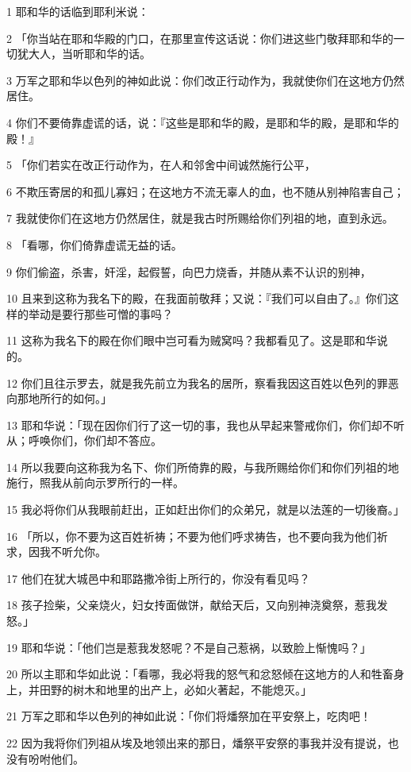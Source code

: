 \par 1 耶和华的话临到耶利米说：
\par 2 「你当站在耶和华殿的门口，在那里宣传这话说：你们进这些门敬拜耶和华的一切犹大人，当听耶和华的话。
\par 3 万军之耶和华以色列的神如此说：你们改正行动作为，我就使你们在这地方仍然居住。
\par 4 你们不要倚靠虚谎的话，说：『这些是耶和华的殿，是耶和华的殿，是耶和华的殿！』
\par 5 「你们若实在改正行动作为，在人和邻舍中间诚然施行公平，
\par 6 不欺压寄居的和孤儿寡妇；在这地方不流无辜人的血，也不随从别神陷害自己；
\par 7 我就使你们在这地方仍然居住，就是我古时所赐给你们列祖的地，直到永远。
\par 8 「看哪，你们倚靠虚谎无益的话。
\par 9 你们偷盗，杀害，奸淫，起假誓，向巴力烧香，并随从素不认识的别神，
\par 10 且来到这称为我名下的殿，在我面前敬拜；又说：『我们可以自由了。』你们这样的举动是要行那些可憎的事吗？
\par 11 这称为我名下的殿在你们眼中岂可看为贼窝吗？我都看见了。这是耶和华说的。
\par 12 你们且往示罗去，就是我先前立为我名的居所，察看我因这百姓以色列的罪恶向那地所行的如何。」
\par 13 耶和华说：「现在因你们行了这一切的事，我也从早起来警戒你们，你们却不听从；呼唤你们，你们却不答应。
\par 14 所以我要向这称我为名下、你们所倚靠的殿，与我所赐给你们和你们列祖的地施行，照我从前向示罗所行的一样。
\par 15 我必将你们从我眼前赶出，正如赶出你们的众弟兄，就是以法莲的一切後裔。」
\par 16 「所以，你不要为这百姓祈祷；不要为他们呼求祷告，也不要向我为他们祈求，因我不听允你。
\par 17 他们在犹大城邑中和耶路撒冷街上所行的，你没有看见吗？
\par 18 孩子捡柴，父亲烧火，妇女抟面做饼，献给天后，又向别神浇奠祭，惹我发怒。」
\par 19 耶和华说：「他们岂是惹我发怒呢？不是自己惹祸，以致脸上惭愧吗？」
\par 20 所以主耶和华如此说：「看哪，我必将我的怒气和忿怒倾在这地方的人和牲畜身上，并田野的树木和地里的出产上，必如火著起，不能熄灭。」
\par 21 万军之耶和华以色列的神如此说：「你们将燔祭加在平安祭上，吃肉吧！
\par 22 因为我将你们列祖从埃及地领出来的那日，燔祭平安祭的事我并没有提说，也没有吩咐他们。
